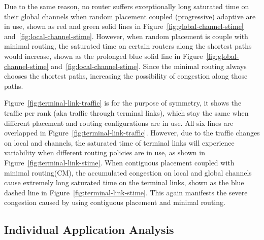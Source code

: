 Due to the same reason, no router suffers exceptionally long saturated time on their global channels when random placement coupled (progressive) adaptive are in use, shown as red and green solid lines in Figure~\ref{fig:global-channel-stime} and~\ref{fig:local-channel-stime}. However, when random placement is couple with minimal routing, the saturated time on certain routers along the shortest paths would increase, shown as the prolonged blue solid line in Figure~\ref{fig:global-channel-stime} and~\ref{fig:local-channel-stime}. Since the minimal routing always chooses the shortest paths, increasing the possibility of congestion along those paths. 



Figure~\ref{fig:terminal-link-traffic} is for the purpose of symmetry, it shows the traffic per rank (aka traffic through terminal links), which stay the same when different placement and routing configurations are in use. All six lines are overlapped in Figure~\ref{fig:terminal-link-traffic}. However, due to the traffic changes on local and channels, the saturated time of terminal links will experience variability when different routing policies are in use, as shown in Figure~\ref{fig:terminal-link-stime}. When contiguous placement coupled with minimal routing(CM), the accumulated congestion on local and global channels cause extremely long saturated time on the terminal links, shown as the blue dashed line in Figure~\ref{fig:terminal-link-stime}. This again manifests the severe congestion caused by using contiguous placement and minimal routing. 


\subsection{Individual Application Analysis}
\label{sec: workload-1 app analysis}

